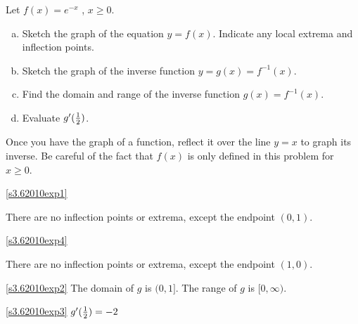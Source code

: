 \begin{question}[2010H]
 Let $f(x) = e^{-x}$ , $x \ge 0$.
\begin{enumerate}[(a)]
\item\label{s3.62010exp1} Sketch the graph of the equation $y = f(x)$. Indicate any
local extrema and inflection points.
\item\label{s3.62010exp4} Sketch the graph of  the inverse function $y = g (x)=f^{-1}(x)$.
\item\label{s3.62010exp2} Find the domain and range of the inverse function $g(x)= f^{-1}(x)$.
\item\label{s3.62010exp3} Evaluate $g'(\tfrac{1}{2})$.
\end{enumerate}
\end{question}
\begin{hint}
Once you have the graph of a function, reflect it over the line $y=x$ to graph its inverse.
Be careful of the fact that $f(x)$ is only defined in this problem for $x \geq 0$.
\end{hint}
\begin{answer}
\eqref{s3.62010exp1}
\begin{center}\end{center}
There are no inflection points or extrema, except the endpoint $(0,1)$.

\eqref{s3.62010exp4}

\begin{center}\end{center}
There are no inflection points or extrema, except the endpoint $(1,0)$.

\eqref{s3.62010exp2}
The domain of $g$ is  $(0,1]$.
The range of $g$ is $[0,\infty)$.

\eqref{s3.62010exp3}
$g'(\tfrac{1}{2})=-2$
\end{answer}
